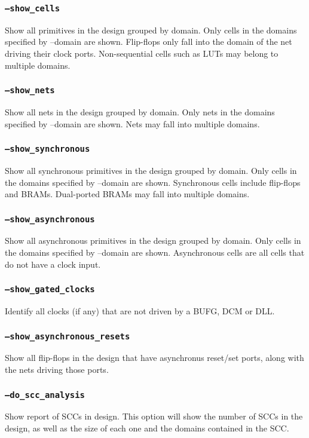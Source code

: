 \documentclass[english]{article}
\begin{document}
\subsubsection{\texttt{--show\_cells}}
Show all primitives in the design grouped by domain. Only cells in the domains
specified by --domain are shown. Flip-flops only fall into the domain of the net
driving their clock ports.  Non-sequential cells such as LUTs may belong to
multiple domains.

\subsubsection{\texttt{--show\_nets}}
Show all nets in the design grouped by domain. Only nets in the domains 
specified by --domain are shown. Nets may fall into multiple domains.

\subsubsection{\texttt{--show\_synchronous}}
Show all synchronous primitives in the design grouped by domain. Only cells in
the domains specified by --domain are shown. Synchronous cells include
flip-flops and BRAMs.  Dual-ported BRAMs may fall into multiple domains.

\subsubsection{\texttt{--show\_asynchronous}}
Show all asynchronous primitives in the design grouped by domain. Only cells in
the domains specified by --domain are shown. Asynchronous cells are all cells
that do not have a clock input.

\subsubsection{\texttt{--show\_gated\_clocks}}
Identify all clocks (if any) that are not driven by a BUFG, DCM or DLL.

\subsubsection{\texttt{--show\_asynchronous\_resets}}
Show all flip-flops in the design that have asynchronus reset/set ports, along
with the nets driving those ports.

\subsubsection{\texttt{--do\_scc\_analysis}}
Show report of SCCs in design.  This option will show the number of SCCs in the
design, as well as the size of each one and the domains contained in the SCC.
\end{document}
